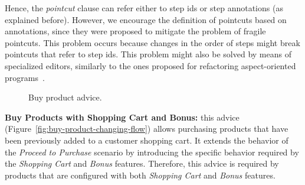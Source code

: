 \documentclass{acm_proc_article-sp}
\begin{document}
{\color{red} Hence, the \emph{pointcut} clause can refer either to step ids or
step annotations (as explained before). However, we encourage the definition of
pointcuts based on annotations, since they were proposed to mitigate the problem
of fragile pointcuts. This problem occurs because changes in the order of
steps might break pointcuts that refer to step ids.}{\color{blue} This problem
might also be solved by means of specialized editors, similarly to the ones proposed for
refactoring aspect-oriented programs~\cite{Wloka:2008aa}.}
 
\begin{figure}[h]
\caption{Buy product advice.}
\label{fig:buy-product-scenario}
\end{figure}

{\bf Buy Products with Shopping Cart and Bonus:} this advice
(Figure~\ref{fig:buy-product-changing-flow}) allows purchasing products
that have been previously added to a customer shopping cart. It extends the
behavior of the \emph{Proceed to Purchase} scenario by introducing the specific
behavior required by the \emph{Shopping Cart} and
\emph{Bonus} features. Therefore, this advice is required by products that
are configured with both \emph{Shopping Cart} and \emph{Bonus} features.
\end{document}
